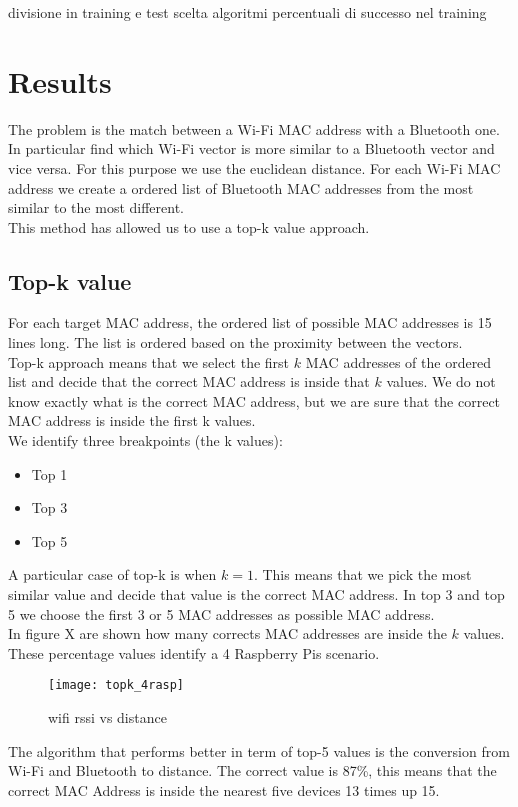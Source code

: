 divisione in training e test
scelta algoritmi
percentuali di successo nel training

\section{Results}
The problem is the match between a Wi-Fi MAC address with a Bluetooth one. In particular find which Wi-Fi vector is more similar to a Bluetooth vector and vice versa. For this purpose we use the euclidean distance. For each Wi-Fi MAC address we create a ordered list of Bluetooth MAC addresses from the most similar to the most different.\\
This method has allowed us to use a top-k value approach.

\subsection{Top-k value}
For each target MAC address, the ordered list of possible MAC addresses is 15 lines long. The list is ordered based on the proximity between the vectors.\\
Top-k approach means that we select the first \(k\) MAC addresses of the ordered list and decide that the correct MAC address is inside that \(k\) values. We do not know exactly what is the correct MAC address, but we are sure that the correct MAC address is inside the first k values.\\
\linebreak 
We identify three breakpoints (the k values):
\begin{itemize}
\item Top 1
\item Top 3
\item Top 5
\end{itemize}
A particular case of top-k is when \(k = 1\). This means that we pick the most similar value and decide that value is the correct MAC address.
In top 3 and top 5 we choose the first 3 or 5 MAC addresses as possible MAC address.\\
\linebreak
In figure X are shown how many corrects MAC addresses are inside the \(k\) values. These percentage values identify a 4 Raspberry Pis scenario.
\begin{figure}[H]
\centering
\texttt{[image: topk\_4rasp]}
\caption{wifi rssi vs distance}
\end{figure}
The algorithm that performs better in term of top-5 values is the conversion from Wi-Fi and Bluetooth to distance. The correct value is 87\%, this means that the correct MAC Address is inside the nearest five devices 13 times up 15.\\

